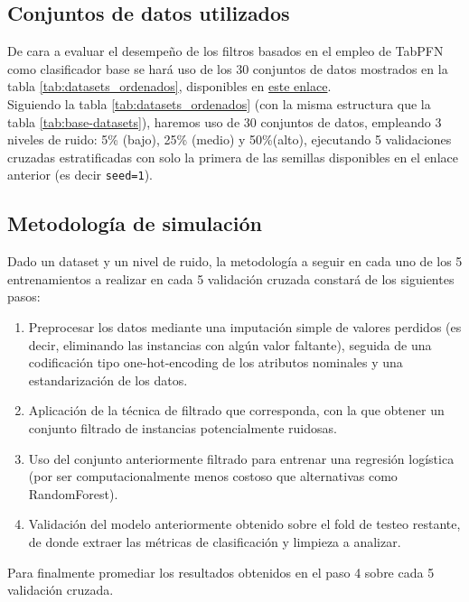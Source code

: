 \documentclass[print, color]{ugrTFG}
\begin{document}
 \subsection{Conjuntos de datos utilizados}
  De cara a evaluar el desempeño de los filtros basados en el empleo de TabPFN como clasificador base se hará uso de los 30 conjuntos de datos mostrados en la tabla \ref{tab:datasets_ordenados}, disponibles en \href{https://sci2s.ugr.es/mcs_noise#Results%20of%20MCSs%20with%20Noisy%20Data}{este enlace}.\\
  
  Siguiendo la tabla \ref{tab:datasets_ordenados} (con la misma estructura que la tabla \ref{tab:base-datasets}), haremos uso de 30 conjuntos de datos, empleando 3 niveles de ruido: 5\% (bajo), 25\% (medio) y 50\%(alto), ejecutando 5 validaciones cruzadas estratificadas con solo la primera de las semillas disponibles en el enlace anterior (es decir \texttt{seed=1}).\\

 \subsection{Metodología de simulación}
 Dado un dataset y un nivel de ruido, la metodología a seguir en cada uno de los 5 entrenamientos a realizar en cada 5 validación cruzada constará de los siguientes pasos:
 \begin{enumerate}
    \item Preprocesar los datos mediante una imputación simple de valores perdidos (es decir, eliminando las instancias con algún valor faltante), seguida de una codificación tipo one-hot-encoding de los atributos nominales y una estandarización de los datos.
    
    \item Aplicación de la técnica de filtrado que corresponda, con la que obtener un conjunto filtrado de instancias potencialmente ruidosas.

    \item Uso del conjunto anteriormente filtrado para entrenar una regresión logística (por ser computacionalmente menos costoso que alternativas como RandomForest).

    \item Validación del modelo anteriormente obtenido sobre el fold de testeo restante, de donde extraer las métricas de clasificación y limpieza a analizar. 
 \end{enumerate}

 Para finalmente promediar los resultados obtenidos en el paso 4 sobre cada 5 validación cruzada.\\
 
\end{document}
